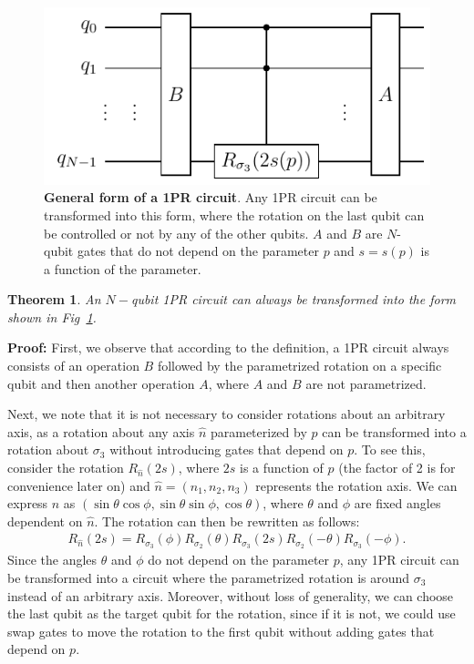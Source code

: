 \documentclass[10pt,letterpaper]{article} %
\newcommand{\fref}[1]{Fig~\ref{#1}}
\newtheorem{theorem}{Theorem}
\begin{document}
\begin{figure} %
\centering
\includegraphics{OPR-circuit.pdf}
\caption{\textbf{General form of a 1PR circuit}.
Any 1PR circuit can be transformed into this form,
where the rotation on the last qubit
can be controlled or not by any of the other qubits.
$A$ and $B$
are $N$-qubit gates that do not depend on the parameter $p$ and
$s= s(p)$ is a function of the parameter.}
\label{Fig4}
\end{figure} %

\begin{theorem}
An $N-$qubit 1PR circuit can always be transformed 
into the form shown in \fref{Fig4}.
\end{theorem}
\textbf{Proof:} 
First, we observe that according to the
definition, a 1PR circuit always consists of an operation $B$ followed 
by the parametrized rotation on a specific qubit and then another operation $A$, 
where $A$ and $B$ are not parametrized.

Next, we note that it is not necessary to consider rotations about an arbitrary axis,
as a rotation about any axis $\hat{n}$ parameterized by $p$
can be transformed into a rotation about $\sigma_3$ without introducing 
gates that depend on $p$. To see this, consider the rotation $R_{\hat{n}}(2s)$, where $2s$ 
is a function of $p$ (the factor of 2 is for convenience later on) 
and $\hat{n} = (n_1,n_2,n_3)$ represents the rotation axis. 
We can express $\hat{n}$ as $(\sin \theta \cos \phi, \sin \theta \sin \phi, \cos \theta)$, 
where $\theta$ and $\phi$ are fixed angles dependent on $\hat{n}$. 
The rotation can then be rewritten as follows:
\begin{eqnarray}
R_{\hat{n}}(2s) = R_{\sigma_3}(\phi) R_{\sigma_2}(\theta) R_{\sigma_3}(2s) R_{\sigma_2}(-\theta) R_{\sigma_3}(-\phi).
\end{eqnarray}
Since the angles $\theta$ and $\phi$ do not depend on the parameter $p$,
any 1PR circuit can be transformed into a circuit where the parametrized
 rotation is around $\sigma_3$ instead of an arbitrary axis. 
Moreover, without loss of generality, we can choose the last qubit as the
target qubit for the rotation, since if it is not, we could use
swap gates to move the rotation
to the first qubit without adding gates
that depend on $p$. 
\end{document}
